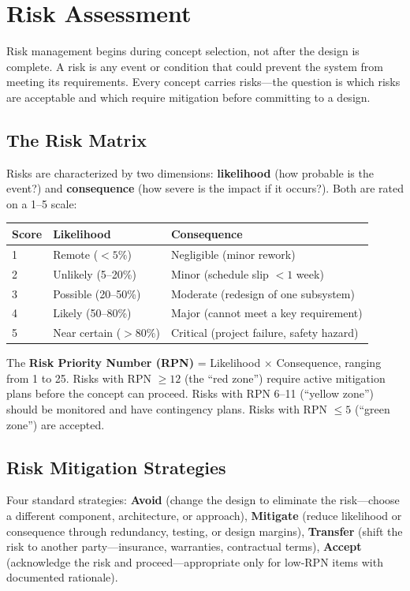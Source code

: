 \documentclass[11pt,letterpaper,twoside,openany]{book}
\begin{document}
\FloatBarrier
\section{Risk Assessment}

Risk management begins during concept selection, not after the design is complete. A risk is any event or condition that could prevent the system from meeting its requirements. Every concept carries risks---the question is which risks are acceptable and which require mitigation before committing to a design.

\subsection{The Risk Matrix}
Risks are characterized by two dimensions: \textbf{likelihood} (how probable is the event?) and \textbf{consequence} (how severe is the impact if it occurs?). Both are rated on a 1--5 scale:

\begin{center}
\small
\begin{tabular}{l l l}
\toprule
\textbf{Score} & \textbf{Likelihood} & \textbf{Consequence} \\
\midrule
1 & Remote ($<5\%$) & Negligible (minor rework) \\
2 & Unlikely (5--20\%) & Minor (schedule slip $<1$ week) \\
3 & Possible (20--50\%) & Moderate (redesign of one subsystem) \\
4 & Likely (50--80\%) & Major (cannot meet a key requirement) \\
5 & Near certain ($>80\%$) & Critical (project failure, safety hazard) \\
\bottomrule
\end{tabular}
\end{center}

The \textbf{Risk Priority Number (RPN)} = Likelihood $\times$ Consequence, ranging from 1 to 25. Risks with RPN $\geq 12$ (the ``red zone'') require active mitigation plans before the concept can proceed. Risks with RPN 6--11 (``yellow zone'') should be monitored and have contingency plans. Risks with RPN $\leq 5$ (``green zone'') are accepted.

\subsection{Risk Mitigation Strategies}
Four standard strategies: \textbf{Avoid} (change the design to eliminate the risk---choose a different component, architecture, or approach), \textbf{Mitigate} (reduce likelihood or consequence through redundancy, testing, or design margins), \textbf{Transfer} (shift the risk to another party---insurance, warranties, contractual terms), \textbf{Accept} (acknowledge the risk and proceed---appropriate only for low-RPN items with documented rationale).
\end{document}
